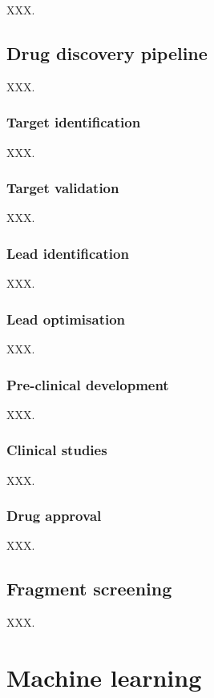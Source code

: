 XXX.

\subsection{Drug discovery pipeline}

XXX.

\subsubsection{Target identification}

XXX.

\subsubsection{Target validation}

XXX.

\subsubsection{Lead identification}

XXX.

\subsubsection{Lead optimisation}

XXX.

\subsubsection{Pre-clinical development}

XXX.

\subsubsection{Clinical studies}

XXX.

\subsubsection{Drug approval}

XXX.

\subsection{Fragment screening}

XXX.

\section{Machine learning}

